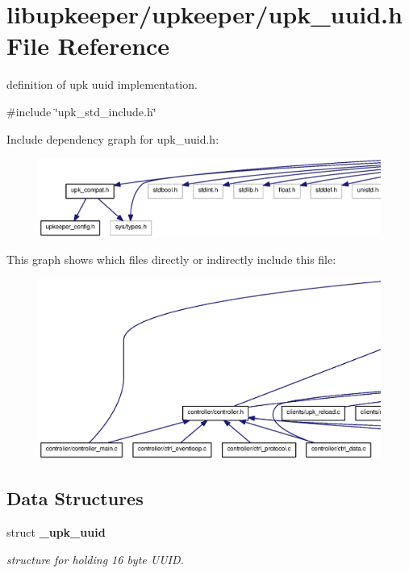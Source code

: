 \section{libupkeeper/upkeeper/upk\_\-uuid.h File Reference}
\label{upk__uuid_8h}


definition of upk uuid implementation.  


{\ttfamily \#include \char`\"{}upk\_\-std\_\-include.h\char`\"{}}\par
Include dependency graph for upk\_\-uuid.h:\nopagebreak
\begin{figure}[H]
\begin{center}
\leavevmode
\includegraphics[width=400pt]{upk__uuid_8h__incl}
\end{center}
\end{figure}
This graph shows which files directly or indirectly include this file:
\nopagebreak
\begin{figure}[H]
\begin{center}
\leavevmode
\includegraphics[width=400pt]{upk__uuid_8h__dep__incl}
\end{center}
\end{figure}
\subsection*{Data Structures}
\begin{DoxyCompactItemize}
\item 
struct {\bf \_\-upk\_\-uuid}
\begin{DoxyCompactList}\small\item\em structure for holding 16 byte UUID. \end{DoxyCompactList}\end{DoxyCompactItemize}

